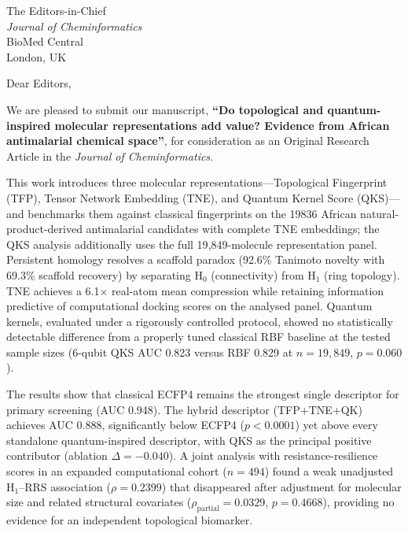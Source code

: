 \documentclass[10pt,a4paper]{letter}
\begin{document}
\begin{letter}{%
  The Editors-in-Chief \\
  \textit{Journal of Cheminformatics} \\
  BioMed Central \\
  London, UK
}

\opening{Dear Editors,}
\small
\setlength{\parskip}{0.35em}

We are pleased to submit our manuscript, \textbf{``Do topological and quantum-inspired molecular representations add value? Evidence from African antimalarial chemical space''}, for consideration as an Original Research Article in the \textit{Journal of Cheminformatics}.

This work introduces three molecular representations---Topological Fingerprint (TFP), Tensor Network Embedding (TNE), and Quantum Kernel Score (QKS)---and benchmarks them against classical fingerprints on the \num{19836} African natural-product-derived antimalarial candidates with complete TNE embeddings; the QKS analysis additionally uses the full 19{,}849-molecule representation panel. Persistent homology resolves a scaffold paradox (92.6\% Tanimoto novelty with 69.3\% scaffold recovery) by separating H$_0$ (connectivity) from H$_1$ (ring topology). TNE achieves a 6.1$\times$ real-atom mean compression while retaining information predictive of computational docking scores on the analysed panel. Quantum kernels, evaluated under a rigorously controlled protocol, showed no statistically detectable difference from a properly tuned classical RBF baseline at the tested sample sizes (6-qubit QKS AUC 0.823 versus RBF 0.829 at $n=19{,}849$, $p=0.060$).

The results show that classical ECFP4 remains the strongest single descriptor for primary screening (AUC 0.948). The hybrid descriptor (TFP+TNE+QK) achieves AUC 0.888, significantly below ECFP4 ($p<0.0001$) yet above every standalone quantum-inspired descriptor, with QKS as the principal positive contributor (ablation $\Delta=-0.040$). A joint analysis with resistance-resilience scores in an expanded computational cohort ($n=494$) found a weak unadjusted H$_1$--RRS association ($\rho=0.2399$) that disappeared after adjustment for molecular size and related structural covariates ($\rho_{\mathrm{partial}}=0.0329$, $p=0.4668$), providing no evidence for an independent topological biomarker.


\end{letter}
\end{document}
